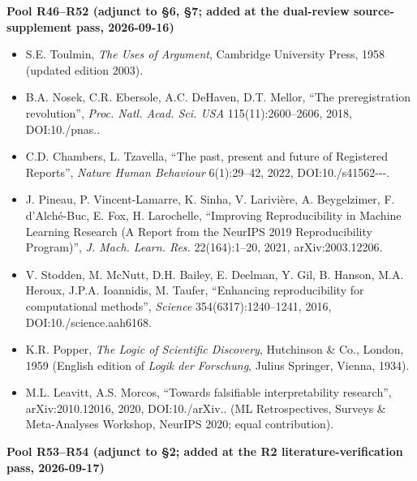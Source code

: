\documentclass[11pt,a4paper]{article}
\begin{document}
\medskip
\noindent\textbf{Pool R46–R52 (adjunct to §6, §7; added at the dual-review source-supplement pass, 2026-09-16)}\par\addvspace{2pt}

\begin{itemize}[leftmargin=1.6em,itemsep=2pt,parsep=0pt,topsep=3pt]
\item[R46.] S.E. Toulmin, \textit{The Uses of Argument}, Cambridge University Press, 1958 (updated edition 2003).
\item[R47.] B.A. Nosek, C.R. Ebersole, A.C. DeHaven, D.T. Mellor, ``The preregistration revolution'', \textit{Proc. Natl. Acad. Sci. USA} 115(11):2600–2606, 2018, DOI:10./\allowbreak pnas..\allowbreak 
\item[R48.] C.D. Chambers, L. Tzavella, ``The past, present and future of Registered Reports'', \textit{Nature Human Behaviour} 6(1):29–42, 2022, DOI:10./\allowbreak s41562---.\allowbreak 
\item[R49.] J. Pineau, P. Vincent-Lamarre, K. Sinha, V. Larivière, A. Beygelzimer, F. d'Alché-Buc, E. Fox, H. Larochelle, ``Improving Reproducibility in Machine Learning Research (A Report from the NeurIPS 2019 Reproducibility Program)'', \textit{J. Mach. Learn. Res.} 22(164):1–20, 2021, arXiv:2003.12206.
\item[R50.] V. Stodden, M. McNutt, D.H. Bailey, E. Deelman, Y. Gil, B. Hanson, M.A. Heroux, J.P.A. Ioannidis, M. Taufer, ``Enhancing reproducibility for computational methods'', \textit{Science} 354(6317):1240–1241, 2016, DOI:10./\allowbreak science.\allowbreak aah6168.\allowbreak 
\item[R51.] K.R. Popper, \textit{The Logic of Scientific Discovery}, Hutchinson \& Co., London, 1959 (English edition of \textit{Logik der Forschung}, Julius Springer, Vienna, 1934).
\item[R52.] M.L. Leavitt, A.S. Morcos, ``Towards falsifiable interpretability research'', arXiv:2010.12016, 2020, DOI:10./\allowbreak arXiv.. (ML Retrospectives, Surveys \& Meta-Analyses Workshop, NeurIPS 2020; equal contribution).
\end{itemize}

\medskip
\noindent\textbf{Pool R53–R54 (adjunct to §2; added at the R2 literature-verification pass, 2026-09-17)}\par\addvspace{2pt}
\end{document}
